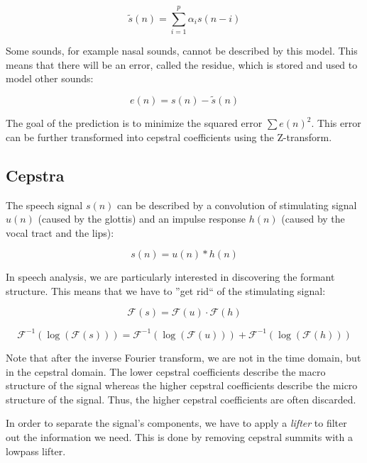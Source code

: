 \documentclass[11pt]{article}
\begin{document}
\begin{equation}
    \tilde{s}(n) = \sum\limits_{i = 1}^p \alpha_i s(n - i)
\end{equation}

Some sounds, for example nasal sounds, cannot be described by this model. This means that there will be an error, called the residue, which is stored and used to model other sounds:

\begin{equation}
    e(n) = s(n) - \tilde{s}(n)
\end{equation}

The goal of the prediction is to minimize the squared error $\sum e(n)^2$. This error can be further transformed into cepstral coefficients using the Z-transform.

\subsection{Cepstra}

The speech signal $s(n)$ can be described by a convolution of stimulating signal $u(n)$ (caused by the glottis) and an impulse response $h(n)$ (caused by the vocal tract and the lips):

\begin{equation}
    s(n) = u(n) \ast h(n)
\end{equation}

In speech analysis, we are particularly interested in discovering the formant structure. This means that we have to ''get rid`` of the stimulating signal:

\begin{equation}
    \mathcal{F}(s) = \mathcal{F}(u) \cdot \mathcal{F}(h)
\end{equation}

\begin{equation}
    \mathcal{F}^{-1}(\log(\mathcal{F}(s))) = \mathcal{F}^{-1}(\log(\mathcal{F}(u))) + \mathcal{F}^{-1}(\log(\mathcal{F}(h)))
\end{equation}

Note that after the inverse Fourier transform, we are not in the time domain, but in the cepstral domain. The lower cepstral coefficients describe the macro structure of the signal whereas the higher cepstral coefficients describe the micro structure of the signal. Thus, the higher cepstral coefficients are often discarded.

In order to separate the signal's components, we have to apply a \textit{lifter} to filter out the information we need. This is done by removing cepstral summits with a lowpass lifter.
\end{document}
